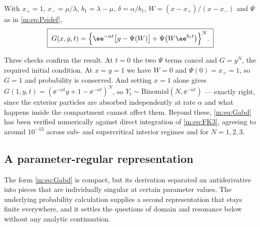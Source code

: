 \begin{proposition}
\label{m:prop:Gabd}
With $x_+=1$, $x_-=\mu/\lambda$, $b_1=\lambda-\mu$, $\delta=\alpha/b_1$,
$W = (x-x_+)/(x-x_-)$ and $\Psi$ as in \cref{m:eq:Psidef},
\begin{equation}
\label{m:eq:Gabd}
\boxed{\;
G(x,y,t) = \Bigl\{\ee^{-\alpha t}\bigl[y-\Psi(W)\bigr] + \Psi\bigl(W\ee^{b_1t}\bigr)\Bigr\}^{N} . \;}
\end{equation}
\end{proposition}

Three checks confirm the result. At $t=0$ the two $\Psi$ terms cancel and $G=y^N$,
the required initial condition. At $x=y=1$ we have $W=0$ and $\Psi(0)=x_+=1$, so
$G=1$ and probability is conserved. And setting $x=1$ alone gives
$G(1,y,t) = (\ee^{-\alpha t}y+1-\ee^{-\alpha t})^N$, so
$Y_t\sim\text{Binomial}(N,\ee^{-\alpha t})$ --- exactly right, since the exterior
particles are absorbed independently at rate $\alpha$ and what happens inside the
compartment cannot affect them. Beyond these, \cref{m:eq:Gabd} has been verified
numerically against direct integration of \cref{m:eq:FK3}, agreeing to around
$10^{-13}$ across sub- and supercritical interior regimes and for $N=1,2,3$.

\subsection{A parameter-regular representation}
\label{m:app:abdregular}

The form \cref{m:eq:Gabd} is compact, but its derivation separated an antiderivative
into pieces that are individually singular at certain parameter values. The
underlying probability calculation supplies a second representation that stays
finite everywhere, and it settles the questions of domain and resonance below
without any analytic continuation.

